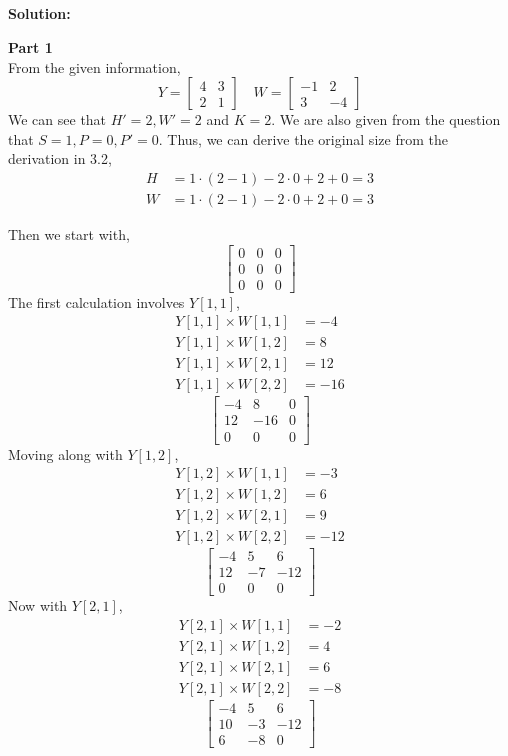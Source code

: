 \documentclass{article}
\newenvironment{solution}
  {\par\noindent\textbf{Solution:}\par}
  {\par}
\begin{document}
\subsection{}
\begin{solution}
  \textbf{Part 1} \\ 
  From the given information, 
  \[ 
Y =\begin{bmatrix}
  4 & 3 \\ 2 & 1
\end{bmatrix} \quad W = \begin{bmatrix}
  -1 & 2 \\ 3 & -4
\end{bmatrix}
    \]
We can see that $H'=2,W'=2$ and $K=2$. We are also given from the question that $S=1,P=0,P'=0$.
Thus, we can derive the original size from the derivation in 3.2,
\[
  \begin{aligned}
    H &= 1 \cdot (2 - 1) - 2 \cdot 0 + 2 + 0 = 3 \\ 
    W &= 1 \cdot (2 - 1) - 2 \cdot 0 +2  + 0  = 3  
  \end{aligned}
\]

Then we start with, 
\[
\begin{bmatrix}
  0 & 0 & 0 \\ 
  0 & 0 & 0 \\ 
  0 & 0 & 0
\end{bmatrix}
\]
The first calculation involves $Y[1,1]$, 
\[
\begin{aligned}
  Y[1,1] \times W[1,1] &= -4 \\ 
  Y[1,1] \times W[1,2] &= 8 \\ 
  Y[1,1] \times W[2,1] &= 12 \\ 
  Y[1,1] \times W[2,2] &= -16
\end{aligned}
\]
\[
\begin{bmatrix}
  -4 & 8 & 0 \\ 
  12 & -16 & 0 \\ 
  0 & 0 & 0
\end{bmatrix}
\]
Moving along with $Y[1,2]$, 
\[
\begin{aligned}
  Y[1,2] \times W[1,1] &= -3 \\ 
  Y[1,2] \times W[1,2] &= 6 \\ 
  Y[1,2] \times W[2,1] &= 9 \\ 
  Y[1,2] \times W[2,2] &= -12
\end{aligned}
\]
\[
\begin{bmatrix}
  -4 & 5 & 6 \\ 
  12 & -7 & -12 \\ 
  0 & 0 & 0
\end{bmatrix}
\]
Now with $Y[2,1]$,
\[
\begin{aligned}
  Y[2,1] \times W[1,1] &= -2 \\ 
  Y[2,1] \times W[1,2] &= 4 \\ 
  Y[2,1] \times W[2,1] &= 6 \\ 
  Y[2,1] \times W[2,2] &= -8
\end{aligned}
\]
\[
\begin{bmatrix}
  -4 & 5 & 6 \\ 
  10 & -3 & -12 \\ 
  6 & -8 & 0
\end{bmatrix}
\]


\end{solution}
\end{document}
